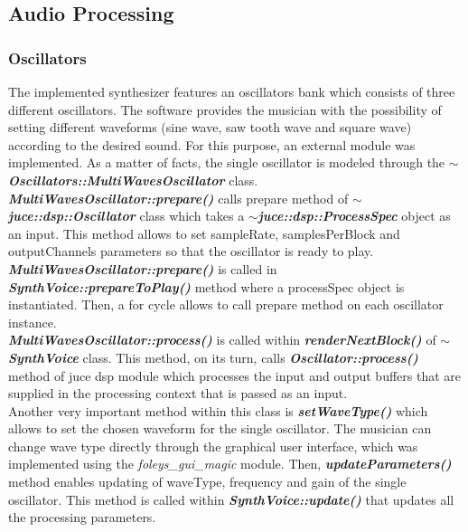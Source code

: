 \documentclass{article}
\begin{document}
\subsection{Audio Processing}

\subsubsection{Oscillators}
The implemented synthesizer features an oscillators bank which consists of three different oscillators. The software provides the musician with the possibility of setting different waveforms (sine wave, saw tooth wave and square wave) according to the desired sound. 
For this purpose, an external module was implemented. As a matter of facts, the single oscillator is modeled through the \textbf{\textit{$\sim$Oscillators::MultiWavesOscillator}} class. 
\\\textbf{\textit{MultiWavesOscillator::prepare()}} calls prepare method of \textbf{\textit{$\sim$juce::dsp::Oscillator}} class which takes a \textbf{\textit{$\sim$juce::dsp::ProcessSpec}} object as an input. This method allows to set sampleRate, samplesPerBlock and outputChannels parameters so that the oscillator is ready to play. \textbf{\textit{MultiWavesOscillator::prepare()}} is called in \textbf{\textit{SynthVoice::prepareToPlay()}} method where a processSpec object is instantiated. Then, a for cycle allows to call prepare method on each oscillator instance.
\\\textbf{\textit{MultiWavesOscillator::process()}} is called within \textbf{\textit{renderNextBlock()}} of \textbf{\textit{$\sim$SynthVoice}} class. This method, on its turn, calls \textbf{\textit{Oscillator::process()}} method of juce dsp module which processes the input and output buffers that are supplied in the processing context that is passed as an input. 
\\Another very important method within this class is \textbf{\textit{setWaveType()}} which allows to set the chosen waveform for the single oscillator. The musician can change wave type directly through the graphical user interface, which was implemented using the \textit{foleys\_gui\_magic} module.
Then, \textbf{\textit{updateParameters()}} method enables updating of waveType, frequency and gain of the single oscillator. This method is called within \textbf{\textit{SynthVoice::update()}} that updates all the processing parameters.
\end{document}
